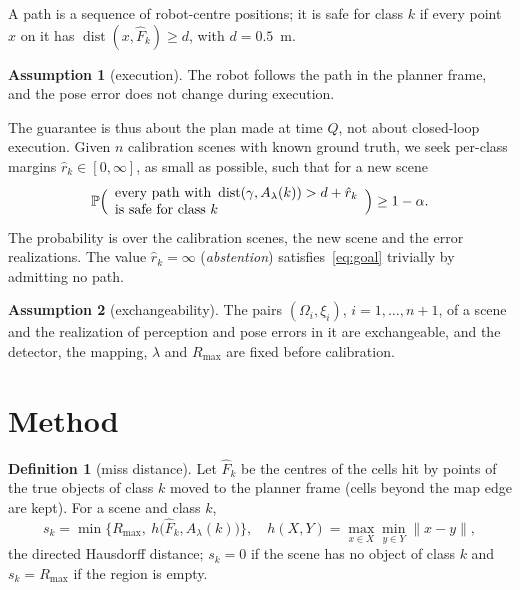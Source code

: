 \documentclass[conference]{IEEEtran}
\theoremstyle{definition}
\newtheorem{definition}{Definition}
\newtheorem{assumption}{Assumption}
\begin{document}
A path is a sequence of robot-centre positions; it is safe for class $k$ if every point $x$ on it has
$\operatorname{dist}(x, \hat F_k) \ge d$, with $d = 0.5$~m.

\begin{assumption}[execution]\label{as:exec}
The robot follows the path in the planner frame, and the pose error does not change during execution.
\end{assumption}

The guarantee is thus about the plan made at time $Q$, not about closed-loop execution. Given $n$ calibration scenes
with known ground truth, we seek per-class margins $\hat r_k \in [0, \infty]$, as small as possible, such that for a new
scene
\begin{equation}
  \mathbb P\Bigl(\begin{array}{l}\text{every path with } \operatorname{dist}(\gamma, A_\lambda(k)) > d + \hat r_k\\ \text{is safe for class } k\end{array}\Bigr) \ge 1 - \alpha.
  \label{eq:goal}
\end{equation}
The probability is over the calibration scenes, the new scene and the error realizations. The value
$\hat r_k = \infty$ (\emph{abstention}) satisfies~\eqref{eq:goal} trivially by admitting no path.

\begin{assumption}[exchangeability]\label{as:exch}
The pairs $(\Omega_i, \xi_i)$, $i = 1, \dots, n + 1$, of a scene and the realization of perception and pose errors in
it are exchangeable, and the detector, the mapping, $\lambda$ and $R_{\max}$ are fixed before calibration.
\end{assumption}

\section{Method}\label{sec:method}

\begin{definition}[miss distance]
Let $\hat F_k$ be the centres of the cells hit by points of the true objects of class $k$ moved to the planner frame
(cells beyond the map edge are kept). For a scene and class $k$,
\begin{equation}
  s_k = \min\bigl\{R_{\max},\ h\bigl(\hat F_k, A_\lambda(k)\bigr)\bigr\},\quad
  h(X, Y) = \max_{x\in X} \min_{y\in Y} \|x - y\|,
  \label{eq:miss}
\end{equation}
the directed Hausdorff distance; $s_k = 0$ if the scene has no object of class $k$ and $s_k = R_{\max}$ if the region
is empty.
\end{definition}
\end{document}
